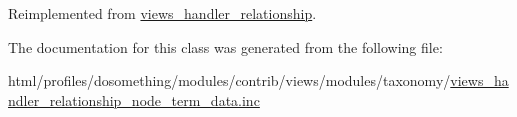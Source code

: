 Reimplemented from \hyperlink{classviews__handler__relationship_a7dc0b6371807dbf06efa594cb52b3348}{views\_\-handler\_\-relationship}.

The documentation for this class was generated from the following file:\begin{DoxyCompactItemize}
\item 
html/profiles/dosomething/modules/contrib/views/modules/taxonomy/\hyperlink{views__handler__relationship__node__term__data_8inc}{views\_\-handler\_\-relationship\_\-node\_\-term\_\-data.inc}\end{DoxyCompactItemize}

